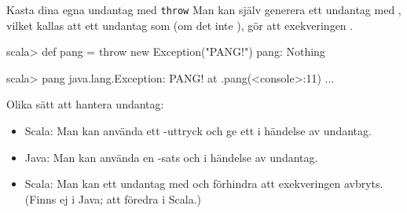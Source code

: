 \begin{Slide}{Kasta dina egna undantag med \texttt{throw}}\SlideFontSmall
Man kan själv generera ett undantag med , vilket kallas att  ett undantag som (om det inte ), gör att exekveringen .


\begin{REPL}
scala> def pang = throw new Exception("PANG!")
pang: Nothing

scala> pang
java.lang.Exception: PANG!
  at .pang(<console>:11)
  ...

\end{REPL}
\pause
Olika sätt att hantera undantag:
\begin{itemize}
\item Scala: Man kan använda ett -uttryck och ge ett  i händelse av undantag.
\item Java: Man kan använda en -sats och  i händelse av undantag.

\item Scala: Man kan  ett undantag med  och förhindra att exekveringen avbryts. (Finns ej i Java; att föredra i Scala.)
\end{itemize}
\end{Slide}



